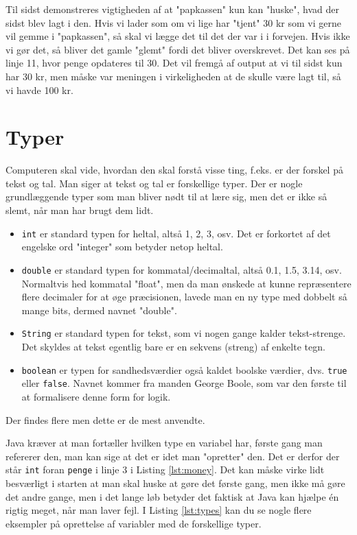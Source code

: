 Til sidst demonstreres vigtigheden af at "papkassen" kun kan "huske", hvad der sidst blev lagt i den. Hvis vi lader som om vi lige har "tjent" 30 kr som vi gerne vil gemme i "papkassen", så skal vi lægge det til det der var i i forvejen. Hvis ikke vi gør det, så bliver det gamle "glemt" fordi det bliver overskrevet. Det kan ses på linje 11, hvor penge opdateres til 30. Det vil fremgå af output at vi til sidst kun har 30 kr, men måske var meningen i virkeligheden at de skulle være lagt til, så vi havde 100 kr.

\section{Typer}
Computeren skal vide, hvordan den skal forstå visse ting, f.eks. er der forskel på tekst og tal. Man siger at tekst og tal er forskellige typer. Der er nogle grundlæggende typer som man bliver nødt til at lære sig, men det er ikke så slemt, når man har brugt dem lidt.

\begin{itemize}
	\item \texttt{int} er standard typen for heltal, altså 1, 2, 3, osv. Det er forkortet af det engelske ord "integer" som betyder netop heltal.
	\item \texttt{double} er standard typen for kommatal/decimaltal, altså 0.1, 1.5, 3.14, osv. Normaltvis hed kommatal "float", men da man ønskede at kunne repræsentere flere decimaler for at øge præcisionen, lavede man en ny type med dobbelt så mange bits, dermed navnet "double".
	\item \texttt{String} er standard typen for tekst, som vi nogen gange kalder tekst-strenge. Det skyldes at tekst egentlig bare er en sekvens (streng) af enkelte tegn.
	\item \texttt{boolean} er typen for sandhedsværdier også kaldet boolske værdier, dvs. \texttt{true} eller \texttt{false}. Navnet kommer fra manden George Boole, som var den første til at formalisere denne form for logik.
\end{itemize}

Der findes flere men dette er de mest anvendte.

Java kræver at man fortæller hvilken type en variabel har, første gang man refererer den, man kan sige at det er idet man "opretter" den. Det er derfor der står \texttt{int} foran \texttt{penge} i linje 3 i Listing \ref{lst:money}. Det kan måske virke lidt besværligt i starten at man skal huske at gøre det første gang, men ikke må gøre det andre gange, men i det lange løb betyder det faktisk at Java kan hjælpe én rigtig meget, når man laver fejl. I Listing \ref{lst:types} kan du se nogle flere eksempler på oprettelse af variabler med de forskellige typer.


